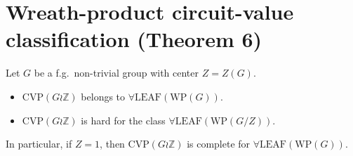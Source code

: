 \section*{Wreath-product circuit-value classification (Theorem 6)}
Let $G$ be a f.g.\ non-trivial group with center $Z=Z(G)$.
\begin{itemize}
\item $\mathrm{CVP}(G\wr\mathbb Z)$ belongs to $\forall\mathrm{LEAF}(\mathrm{WP}(G))$.
\item $\mathrm{CVP}(G\wr\mathbb Z)$ is hard for the class $\forall\mathrm{LEAF}(\mathrm{WP}(G/Z))$.
\end{itemize}
In particular, if $Z=1$, then $\mathrm{CVP}(G\wr\mathbb Z)$ is complete for $\forall\mathrm{LEAF}(\mathrm{WP}(G))$.
